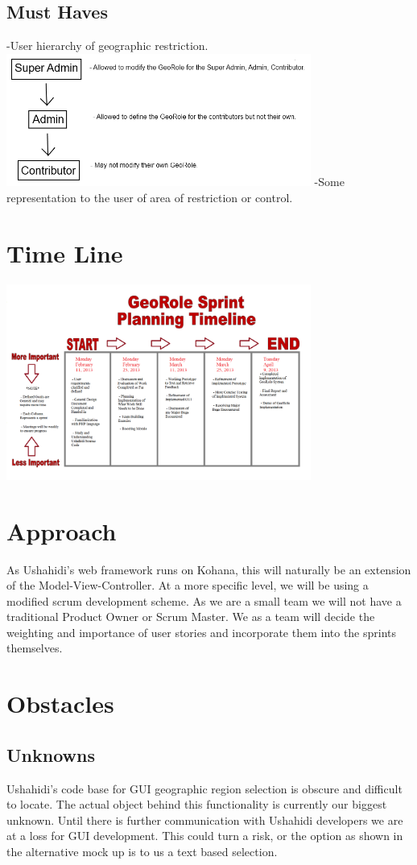 \documentclass{article}
\begin{document}
\subsection{Must Haves}
-User hierarchy of geographic restriction.
\includegraphics[width=100mm]{permissions.png}
-Some representation to the user of area of restriction or control.

\section{Time Line}
\includegraphics[width=100mm]{UshahidiTimeline.png}

\section{Approach}
As Ushahidi's web framework runs on Kohana, this will naturally be an extension of the Model-View-Controller. At a more specific level, we will be using a modified scrum development scheme. As we are a small team we will not have a traditional Product Owner or Scrum Master. We as a team will decide the weighting and importance of user stories and incorporate them into the sprints themselves.

\section{Obstacles}
\subsection{Unknowns}
Ushahidi's code base for GUI geographic region selection is obscure and difficult to locate. The actual object behind this functionality is currently our biggest unknown. Until there is further communication with Ushahidi developers we are at a loss for GUI development. This could turn a risk, or the option as shown in the alternative mock up is to us a text based selection.
\end{document}
